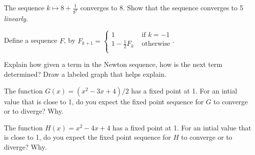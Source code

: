\documentclass[12pt,fleqn]{exam}
\begin{document}
\begin{questions}
\question[5]  The sequence  \(\displaystyle k \mapsto 8 + \frac{1}{8^k} \) converges to 8. Show that the sequence 
 converges to 5 \emph{linearly}.


\begin{solution}%

\end{solution}



\question Define a sequence \(F\), by \(F_{k+1} = \begin{cases}  1  & \mbox{ if } k =-1  \\  1 - \frac{1}{2} F_k   & \mbox{ otherwise} \\  \end{cases} \).




\question [5]  Explain how given a term  in the Newton  sequence, how is the next term determined?  Draw a labeled graph that helps explain.
\begin{solution}%

\end{solution}
\question The function \(G(x) = (x^2 - 3 x + 4)/2 \) has a fixed point at 1.  For an intial value that is close to 1, do you expect the fixed point sequence for \(G\) to converge or to diverge?  Why.

\question The function \(H(x) = x^2 - 4 x + 4 \) has a fixed point at 1.  For an intial value that is close to 1, do you expect the fixed point sequence for \(H\) to converge or to diverge?  Why.



\end{questions}
\end{document}
